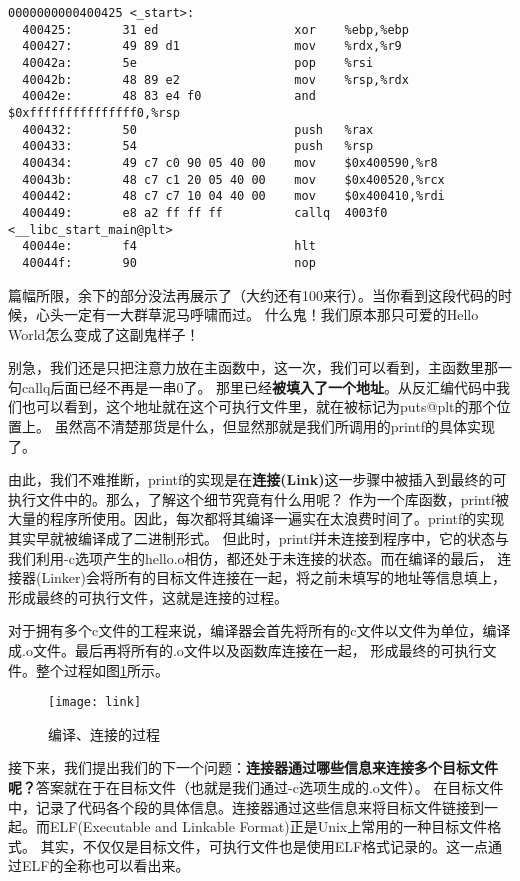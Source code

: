 \begin{verbatim}
0000000000400425 <_start>:
  400425:       31 ed                   xor    %ebp,%ebp
  400427:       49 89 d1                mov    %rdx,%r9
  40042a:       5e                      pop    %rsi
  40042b:       48 89 e2                mov    %rsp,%rdx
  40042e:       48 83 e4 f0             and    $0xfffffffffffffff0,%rsp
  400432:       50                      push   %rax
  400433:       54                      push   %rsp
  400434:       49 c7 c0 90 05 40 00    mov    $0x400590,%r8
  40043b:       48 c7 c1 20 05 40 00    mov    $0x400520,%rcx
  400442:       48 c7 c7 10 04 40 00    mov    $0x400410,%rdi
  400449:       e8 a2 ff ff ff          callq  4003f0 <__libc_start_main@plt>
  40044e:       f4                      hlt    
  40044f:       90                      nop
\end{verbatim}

篇幅所限，余下的部分没法再展示了（大约还有100来行）。当你看到这段代码的时候，心头一定有一大群草泥马呼啸而过。
什么鬼！我们原本那只可爱的Hello World怎么变成了这副鬼样子！

别急，我们还是只把注意力放在主函数中，这一次，我们可以看到，主函数里那一句callq后面已经不再是一串0了。
那里已经\textbf{被填入了一个地址}。从反汇编代码中我们也可以看到，这个地址就在这个可执行文件里，就在被标记为puts@plt的那个位置上。
虽然高不清楚那货是什么，但显然那就是我们所调用的printf的具体实现了。

由此，我们不难推断，printf的实现是在\textbf{连接(Link)}这一步骤中被插入到最终的可执行文件中的。那么，了解这个细节究竟有什么用呢？
作为一个库函数，printf被大量的程序所使用。因此，每次都将其编译一遍实在太浪费时间了。printf的实现其实早就被编译成了二进制形式。
但此时，printf并未连接到程序中，它的状态与我们利用-c选项产生的hello.o相仿，都还处于未连接的状态。而在编译的最后，
连接器(Linker)会将所有的目标文件连接在一起，将之前未填写的地址等信息填上，形成最终的可执行文件，这就是连接的过程。

对于拥有多个c文件的工程来说，编译器会首先将所有的c文件以文件为单位，编译成.o文件。最后再将所有的.o文件以及函数库连接在一起，
形成最终的可执行文件。整个过程如图\ref{fig:link}所示。

\begin{figure}[htbp]
  \centering
  \texttt{[image: link]}
  \caption{编译、连接的过程}\label{fig:link} 
\end{figure}

接下来，我们提出我们的下一个问题：\textbf{连接器通过哪些信息来连接多个目标文件呢？}答案就在于在目标文件（也就是我们通过-c选项生成的.o文件）。
在目标文件中，记录了代码各个段的具体信息。连接器通过这些信息来将目标文件链接到一起。而ELF(Executable and Linkable Format)正是Unix上常用的一种目标文件格式。
其实，不仅仅是目标文件，可执行文件也是使用ELF格式记录的。这一点通过ELF的全称也可以看出来。

